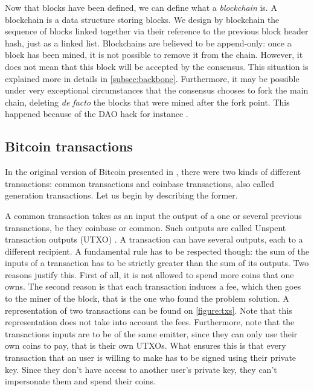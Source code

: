         Now that blocks have been defined, we can define what a \textit{blockchain} is. A blockchain is a data structure storing blocks. We design by blockchain the sequence of blocks linked together via their reference to the previous block header hash, just as a linked list. Blockchains are believed to be append-only: once a block has been mined, it is not possible to remove it from the chain. However, it does not mean that this block will be accepted by the consensus. This situation is explained more in details in \autoref{subsec:backbone}. Furthermore, it may be possible under very exceptional circumstances that the consensus chooses to fork the main chain, deleting \textit{de facto} the blocks that were mined after the fork point. This happened because of the DAO hack for instance \cite{DAO}.
      
    \subsection{Bitcoin transactions}
        \label{subsec:txs}
        In the original version of Bitcoin presented in \cite{Bitcoin}, there  were two kinds of different transactions: common transactions and coinbase transactions, also called generation transactions. Let us begin by describing the former.
        
        A common transaction takes as an input the output of a one or several previous transactions, be they coinbase or common. Such outputs are called Unspent transaction outputs (UTXO) \cite{Survey}. A transaction can have several outputs, each to a different recipient. A fundamental rule has to be respected though: the sum of the inputs of a transaction has to be strictly greater than the sum of its outputs. Two reasons justify this. First of all, it is not allowed to spend more coins that one owns. The second reason is that each transaction induces a fee, which then goes to the miner of the block, that is the one who found the problem solution. A representation of two transactions can be found on \autoref{figure:txs}. Note that this representation does not take into account the fees. Furthermore, note that the transactions inputs are to be of the same emitter, since they can only use their own coins to pay, that is their own UTXOs. What ensures this is that every transaction that an user is willing to make has to be signed using their private key. Since they don't have access to another user's private key, they can't impersonate them and spend their coins.
        
